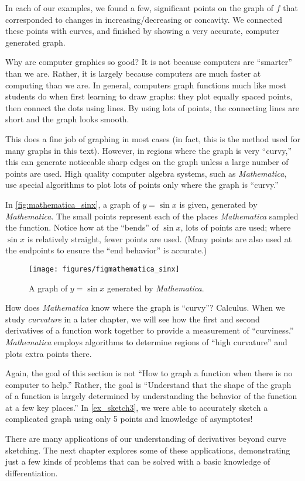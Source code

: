 In each of our examples, we found a few, significant points on the graph of $f$ that corresponded to changes in increasing/decreasing or concavity. We connected these points with curves, and finished by showing a very accurate, computer generated graph. 

Why are computer graphics so good? It is not because computers are ``smart\-er'' than we are. Rather, it is largely because computers are much faster at computing than we are. In general, computers graph functions much like most students do when first learning to draw graphs: they plot equally spaced points, then connect the dots using lines. By using lots of points, the connecting lines are short and the graph looks smooth. 

This does a fine job of graphing in most cases (in fact, this is the method used for many graphs in this text). However, in regions where the graph is very ``curvy,'' this can generate noticeable sharp edges on the graph unless a large number of points are used. High quality computer algebra systems, such as \textit{Mathematica}, use special algorithms to plot lots of points only where the graph is ``curvy.''

In \autoref{fig:mathematica_sinx}, a graph of $y=\sin x$ is given, generated by \textit{Mathematica}. The small points represent each of the places \textit{Mathematica} sampled the function. Notice how at the ``bends'' of $\sin x$, lots of points are used; where $\sin x$ is relatively straight, fewer points are used. (Many points are also used at the endpoints to ensure the ``end behavior'' is accurate.) 

\begin{figure}[!ht]
\centering
\texttt{[image: figures/figmathematica\_sinx]}
\caption{A graph of $y=\sin x$ generated by \textit{Mathematica}.}
\label{fig:mathematica_sinx}
\end{figure}

How does \textit{Mathematica} know where the graph is ``curvy''? Calculus. When we study \textit{curvature} in a later chapter, we will see how the first and second derivatives of a function work together to provide a measurement of ``curviness.'' \textit{Mathematica} employs algorithms to determine regions of ``high curvature'' and plots extra points there.

Again, the goal of this section is not ``How to graph a function when there is no computer to help.'' Rather, the goal is ``Understand that the shape of the graph of a function is largely determined by understanding the behavior of the function at a few key places.'' In \autoref{ex_sketch3}, we were able to accurately sketch a complicated graph using only 5 points and knowledge of asymptotes!

There are many applications of our understanding of derivatives beyond curve sketching. The next chapter explores some of these applications, demonstrating just a few kinds of problems that can be solved with a basic knowledge of differentiation. 

